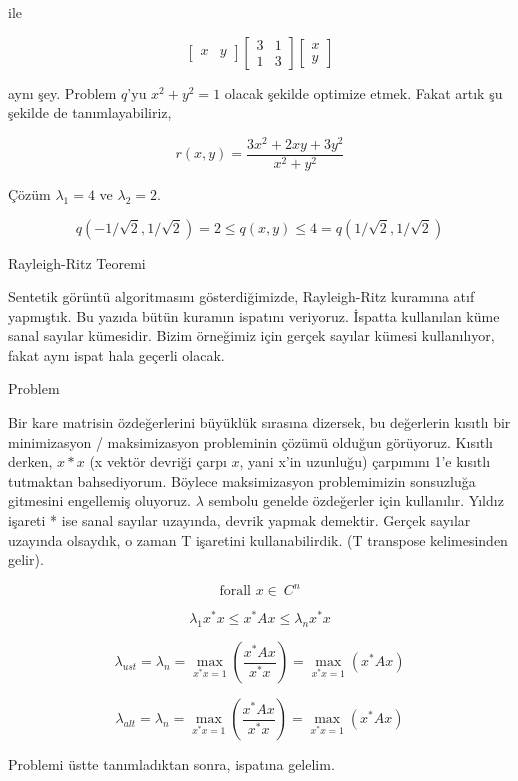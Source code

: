 \documentclass[12pt,fleqn]{article}\usepackage{../../common}
\begin{document}
ile

$$
\left[\begin{array}{cc} x & y \end{array}\right]
\left[\begin{array}{rrr}3 & 1 \\ 1 & 3 \end{array}\right]
\left[\begin{array}{c} x \\ y \end{array}\right]
$$

aynı şey. Problem $q$'yu $x^2+y^2 = 1$ olacak şekilde optimize etmek. Fakat
artık şu şekilde de tanımlayabiliriz,

$$
r(x,y) = \frac{ 3x^2 + 2xy + 3y^2}{x^2+y^2 }
$$

Çözüm $\lambda_1=4$ ve $\lambda_2 = 2$.

$$
q(-1/\sqrt{2},1/\sqrt{2}) =
2 \le q(x,y) \le 4 =
q(1/\sqrt{2},1/\sqrt{2})
$$


Rayleigh-Ritz Teoremi

Sentetik görüntü algoritmasını gösterdiğimizde, Rayleigh-Ritz kuramına atıf
yapmıştık. Bu yazıda bütün kuramın ispatını veriyoruz. İspatta kullanılan
küme sanal sayılar kümesidir. Bizim örneğimiz için gerçek sayılar kümesi
kullanılıyor, fakat aynı ispat hala geçerli olacak.

Problem

Bir kare matrisin özdeğerlerini büyüklük sırasına dizersek, bu değerlerin
kısıtlı bir minimizasyon / maksimizasyon probleminin çözümü olduğun
görüyoruz. Kısıtlı derken, $x*x$ (x vektör devriği çarpı $x$, yani x'in
uzunluğu) çarpımını 1'e kısıtlı tutmaktan bahsediyorum. Böylece
maksimizasyon problemimizin sonsuzluğa gitmesini engellemiş
oluyoruz. $\lambda$ sembolu genelde özdeğerler için kullanılır. Yıldız
işareti * ise sanal sayılar uzayında, devrik yapmak demektir. Gerçek
sayılar uzayında olsaydık, o zaman T işaretini kullanabilirdik. (T
transpose kelimesinden gelir).

$$ \textrm{forall } x \in \ C^n  $$

$$ \lambda_1x^\ast x \le x^\ast A x \le \lambda_nx^\ast x  $$

$$ 
\lambda_{ust} = \lambda_n = 
\max\limits_{x^\ast x=1} (\frac{x^\ast A x}{x^\ast x}) =
\max\limits_{x^\ast x=1}(x^\ast Ax)
$$

$$ 
\lambda_{alt} = \lambda_n = 
\max\limits_{x^\ast x=1} (\frac{x^\ast Ax}{x^\ast x}) =
\max\limits_{x^\ast x=1}(x^\ast Ax)
$$

Problemi üstte tanımladıktan sonra, ispatına gelelim. 
\end{document}
